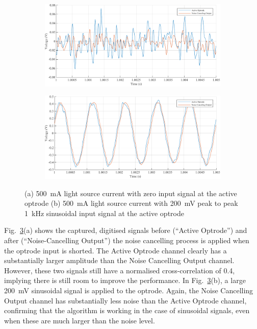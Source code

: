 \begin{figure}
\centering
\begin{subfigure}{1\textwidth}
  \centering
  \includegraphics[scale = 0.8]{5-Experiment/500mA Signal_a.pdf}
  \caption{}
  \label{fig_500mA Signal_a}
\end{subfigure}
\begin{subfigure}{1\textwidth}
  \centering
  \includegraphics[scale = 0.8]{5-Experiment/500mA Signal_b.pdf}
  \caption{}
  \label{fig_500mA Signal_b}
\end{subfigure}
\caption{(a) \qty{500}{\mA} light source current with zero input signal at the active optrode (b) \qty{500}{\mA} light source current with \qty{200}{\mV} peak to peak \qty{1}{\kHz} sinusoidal input signal at the active optrode}
\label{fig_500mA Signal}
\end{figure}

Fig.~\ref{fig_500mA Signal}(a) shows the captured, digitised signals before (``Active Optrode'') and after (``Noise-Cancelling Output'') the noise cancelling process is applied when the optrode input is shorted.  The Active Optrode channel clearly has a substantially larger amplitude than the Noise Cancelling Output channel.  However, these two signals still have a normalised cross-correlation of 0.4, implying there is still room to improve the performance. In Fig.~\ref{fig_500mA Signal}(b), a large \qty{200}{mV} sinusoidal signal is applied to the optrode.  Again, the Noise Cancelling Output channel has substantially less noise than the Active Optrode channel, confirming that the algorithm is working in the case of sinusoidal signals, even when these are much larger than the noise level. 

